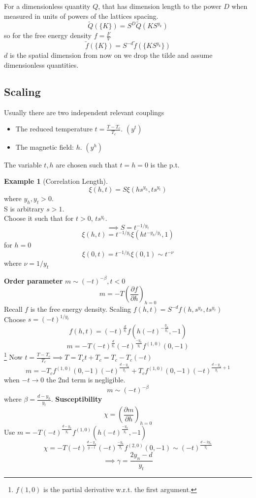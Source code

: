 \documentclass[11pt]{book}
\theoremstyle{definition}
\newtheorem{exm}{Example}[section]
\newlength{\drop}%
\begin{document}
For a dimensionless quantity $ Q $, that has dimension length to the power $ D $ when measured in units of powers of the lattices spacing. 
\[ \tilde Q \left( \{ K \}  \right) = S^{D} \tilde Q({KS^{y_k}})  \] 
so for the free energy density $ f = \frac{F}{V} $ 
\[ \tilde f \left( \{ K \}  \right) = S^{-d} \tilde f \left( \{ KS^{y_k} \}  \right)   \] 
$ d $ is the spatial dimension
from now on we drop the tilde and assume dimensionless quantities.

\subsection{Scaling}
Usually there are two independent relevant couplings
\begin{itemize}
	\item The reduced temperature $ t = \frac{T-T_c}{T_c} $. $(y^{t})$
	\item The magnetic field: $ h $. $(y^{h})$
\end{itemize}
The variable $ t,h $ are chosen such that $ t=h=0 $ is the p.t. \\

\begin{exm}[Correlation Length]
	\[\xi(h,t) = S \xi(hs^{y_h}, ts^{y_t})\]
	where $ y_h, y_t > 0$. \\ 
	S is arbitrary $ s>1 $. \\
	Choose it such that for $ t>0 $, $ ts^{y_t} $. 
	\[ \implies S = t^{-1/y_t} \] 
	\[ \xi(h, t) = t^{-1/y_t} \xi(ht^{-y_h/y_t}, 1) \] 
	for $ h=0 $ 
	\[ \xi(0,t) = t^{-1/y_t} \xi(0,1) \sim t^{-\nu}\] where $ \nu = 1/{y_t} $ 
\end{exm}

\textbf{Order parameter}
	$ m \sim (-t)^{-\beta}, t<0 $ \\
	\[ m = -T \left( \frac{\partial f}{\partial h} \right)_{h=0}  \] 
	Recall $ f $ is the free energy density.
	Scaling $ f(h,t) = S^{-d} f(h, s^{y_h}, ts^{y_t})$  \\
	Choose $ s = (-t)^{1/y_t} $
	\[ f(h,t) = (-t)^{\frac{d}{y_t}} f \left(h\left( -t \right)^{-\frac{y_h}{y_t}}, -1 \right)\] 
	\[ m = -T (-t)^{\frac{d}{y_t}} (-t)^{\frac{-y_h}{y_t}} f^{(1,0)}(0,-1) \]\footnote{$ f(1,0) $ is the partial derivative w.r.t. the first argument. } 
	Now $ t = \frac{T-T_c}{T_c} \implies T = T_ct + T_c  = T_c - T_c(-t)$ 
	\[ m = -T_cf^{(1,0)}(0,-1) (-t)^{\frac{d-y_h}{y_t}}  + T_c f^{(1,0)} (0,-1) (-t)^{\frac{d-y_h}{y_t} +1}\] 
	when $ -t \to 0 $ the 2nd term is negligible.
	\[ m \sim (-t)^{-\beta}\] where $ \beta =\frac{d-y_h}{y_t} $.
\textbf{Susceptibility}
	\[ \chi = \left( \frac{\partial m}{\partial h} \right)_{h=0}  \] 
	Use $ m = -T (-t)^{\frac{d-y_h}{y_t}}f^{(1,0)} (h(-t)^{\frac{-y_h}{y_t}} ,-1) $ 
	\[ \chi = -T(-t)^{\frac{d-y_h}{y-t}} (-t)^{\frac{-y_h}{y_t}} f^{(2,0)}(0,-1) \sim (-t)^{\frac{d-2y_h}{y_t}} \] 
	\[ \implies \gamma = \frac{2y_n-d}{y_t} \] 
\end{document}
